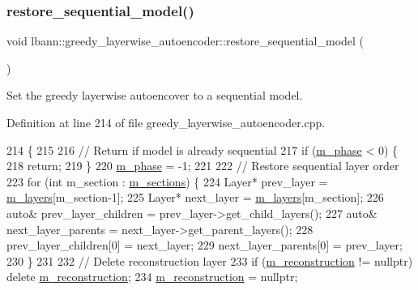 \subsubsection{\texorpdfstring{restore\+\_\+sequential\+\_\+model()}{restore\_sequential\_model()}}
{\footnotesize\ttfamily void lbann\+::greedy\+\_\+layerwise\+\_\+autoencoder\+::restore\+\_\+sequential\+\_\+model (\begin{DoxyParamCaption}{ }\end{DoxyParamCaption})\hspace{0.3cm}{\ttfamily [protected]}}

Set the greedy layerwise autoencover to a sequential model. 

Definition at line 214 of file greedy\+\_\+layerwise\+\_\+autoencoder.\+cpp.


\begin{DoxyCode}
214                                                             \{
215 
216   \textcolor{comment}{// Return if model is already sequential}
217   \textcolor{keywordflow}{if} (\hyperlink{classlbann_1_1greedy__layerwise__autoencoder_a1baf1b5e7fdb5d006f443edbb0bb2973}{m\_phase} < 0) \{
218     \textcolor{keywordflow}{return};
219   \}
220   \hyperlink{classlbann_1_1greedy__layerwise__autoencoder_a1baf1b5e7fdb5d006f443edbb0bb2973}{m\_phase} = -1;
221 
222   \textcolor{comment}{// Restore sequential layer order}
223   \textcolor{keywordflow}{for} (\textcolor{keywordtype}{int} m\_section : \hyperlink{classlbann_1_1greedy__layerwise__autoencoder_aacb3dbf01c38f46a32927722420c5d41}{m\_sections}) \{
224     Layer* prev\_layer = \hyperlink{classlbann_1_1model_a0229fc226ec163d1411548446104569d}{m\_layers}[m\_section-1];
225     Layer* next\_layer = \hyperlink{classlbann_1_1model_a0229fc226ec163d1411548446104569d}{m\_layers}[m\_section];
226     \textcolor{keyword}{auto}& prev\_layer\_children = prev\_layer->get\_child\_layers();
227     \textcolor{keyword}{auto}& next\_layer\_parents = next\_layer->get\_parent\_layers();
228     prev\_layer\_children[0] = next\_layer;
229     next\_layer\_parents[0] = prev\_layer;
230   \}
231 
232   \textcolor{comment}{// Delete reconstruction layer}
233   \textcolor{keywordflow}{if} (\hyperlink{classlbann_1_1greedy__layerwise__autoencoder_a8238d2e3e723543c8b6f7f5c61a9ca06}{m\_reconstruction} != \textcolor{keyword}{nullptr}) \textcolor{keyword}{delete} \hyperlink{classlbann_1_1greedy__layerwise__autoencoder_a8238d2e3e723543c8b6f7f5c61a9ca06}{m\_reconstruction};
234   \hyperlink{classlbann_1_1greedy__layerwise__autoencoder_a8238d2e3e723543c8b6f7f5c61a9ca06}{m\_reconstruction} = \textcolor{keyword}{nullptr};

\end{DoxyCode}
